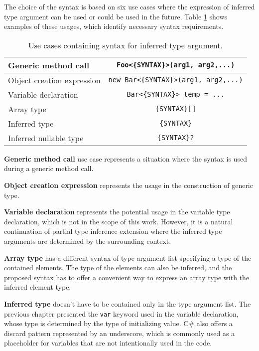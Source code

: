 The choice of the syntax is based on six use cases where the expression of inferred type argument can be used or could be used in the future. 
Table \ref{table2:useCasesChar} shows examples of these usages, which identify necessary syntax requirements.
\begin{table}[h]
\begin{center}
\begin{tabular}{ | l | c | } 
  \hline
  Generic method call & \texttt{Foo<\{SYNTAX\}>(arg1, arg2,...)}\\
  \hline
  Object creation expression & \texttt{new Bar<\{SYNTAX\}>(arg1, arg2,...)}\\
  \hline
  Variable declaration & \texttt{Bar<\{SYNTAX\}> temp = ...}\\
  \hline
  Array type & \texttt{\{SYNTAX\}[]}\\
  \hline
  Inferred type & \texttt{\{SYNTAX\}}\\
  \hline
  Inferred nullable type & \texttt{\{SYNTAX\}?}\\
  \hline
\end{tabular}
\end{center}
\caption{Use cases containing syntax for inferred type argument.}
\label{table2:useCasesChar}
\end{table}
\par
\textbf{Generic method call} use case represents a situation where the syntax is used during a generic method call.
\par
\textbf{Object creation expression} represents the usage in the construction of generic type.
\par
\textbf{Variable declaration} represents the potential usage in the variable type declaration, which is not in the scope of this work. 
However, it is a natural continuation of partial type inference extension where the inferred type arguments are determined by the surrounding context.
\par
\textbf{Array type} has a different syntax of type argument list specifying a type of the contained elements. 
The type of the elements can also be inferred, and the proposed syntax has to offer a convenient way to express an array type with the inferred element type.
\par
\textbf{Inferred type} doesn’t have to be contained only in the type argument list.
The previous chapter presented the \texttt{var} keyword used in the variable declaration, whose type is determined by the type of initializing value. 
C\# also offers a discard pattern \cite{online:discard} represented by an underscore, which is commonly used as a placeholder for variables that are not intentionally used in the code. 
